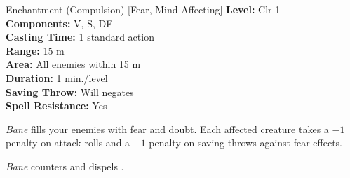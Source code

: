 {Enchantment (Compulsion) [Fear, Mind-Affecting]}
{
	\textbf{Level:}
	Clr 1\\
	\textbf{Components:}
	V, S, DF\\
	\textbf{Casting Time:}
	1 standard action\\
	\textbf{Range:}
	15 m\\
	\textbf{Area:}
	All enemies within 15 m\\
	\textbf{Duration:}
	1 min./level\\
	\textbf{Saving Throw:}
	Will negates\\
	\textbf{Spell Resistance:}
	Yes\\
}
{
	\emph{Bane} fills your enemies with fear and doubt. Each affected creature takes a $-1$ penalty on attack rolls and a $-1$ penalty on saving throws against fear effects.

	\emph{Bane} counters and dispels .

}
